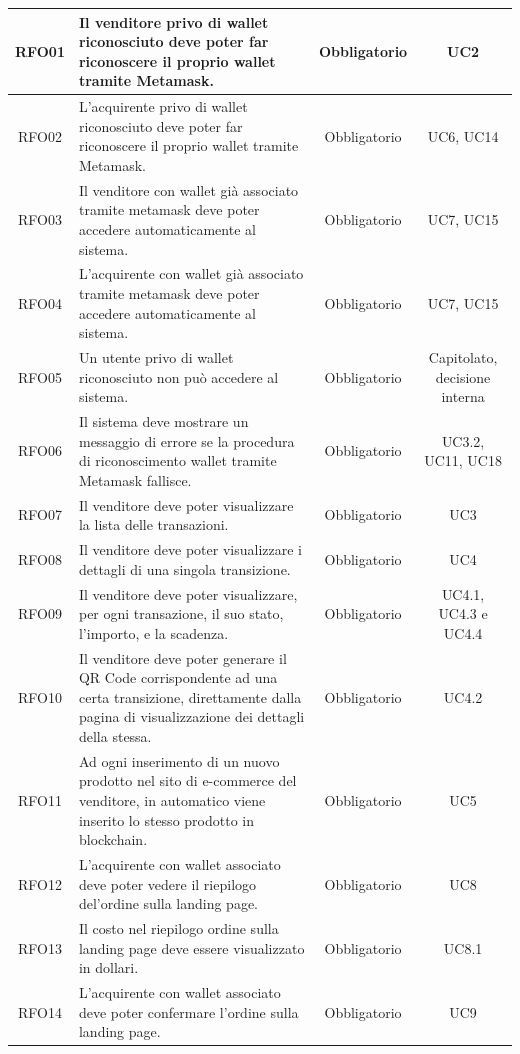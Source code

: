 \documentclass[a4paper, 12pt]{article}
\begin{document}
\begin{longtable}{|c|p{5cm}|c|c|}
\hline
RFO01 & Il venditore privo di wallet riconosciuto deve poter far riconoscere il proprio wallet tramite Metamask. & Obbligatorio & UC2 \\
\hline
RFO02 & L'acquirente privo di wallet riconosciuto deve poter far riconoscere il proprio wallet tramite Metamask. & Obbligatorio & UC6, UC14 \\
\hline
RFO03 & Il venditore con wallet già associato tramite metamask deve poter accedere automaticamente al sistema. & Obbligatorio & UC7, UC15 \\
\hline
RFO04 & L'acquirente con wallet già associato tramite metamask deve poter accedere automaticamente al sistema. & Obbligatorio & UC7, UC15 \\
\hline
RFO05 & Un utente privo di wallet riconosciuto non può accedere al sistema. & Obbligatorio & Capitolato, decisione interna \\
\hline
RFO06 & Il sistema deve mostrare un messaggio di errore se la procedura di riconoscimento wallet tramite Metamask fallisce. & Obbligatorio & UC3.2, UC11, UC18 \\
\hline
RFO07 & Il venditore deve poter visualizzare la lista delle transazioni. & Obbligatorio & UC3 \\ 
\hline
RFO08 & Il venditore deve poter visualizzare i dettagli di una singola transizione. & Obbligatorio & UC4 \\ 
\hline
RFO09 & Il venditore deve poter visualizzare, per ogni transazione, il suo stato, l'importo, e la scadenza. & Obbligatorio & UC4.1, UC4.3 e UC4.4 \\ 
\hline
RFO10 & Il venditore deve poter generare il QR Code corrispondente ad una certa transizione, direttamente dalla pagina di visualizzazione dei dettagli della stessa. & Obbligatorio & UC4.2 \\ 
\hline
RFO11 & Ad ogni inserimento di un nuovo prodotto nel sito di e-commerce del venditore, in automatico viene inserito lo stesso prodotto in blockchain. & Obbligatorio & UC5 \\ 
\hline
RFO12 & L'acquirente con wallet associato deve poter vedere il riepilogo del'ordine sulla landing page. & Obbligatorio & UC8 \\
\hline
RFO13 & Il costo nel riepilogo ordine sulla landing page deve essere visualizzato in dollari. & Obbligatorio & UC8.1 \\
\hline
RFO14 & L'acquirente con wallet associato deve poter confermare l'ordine sulla landing page. & Obbligatorio & UC9 \\
\hline

\end{longtable}
\end{document}
